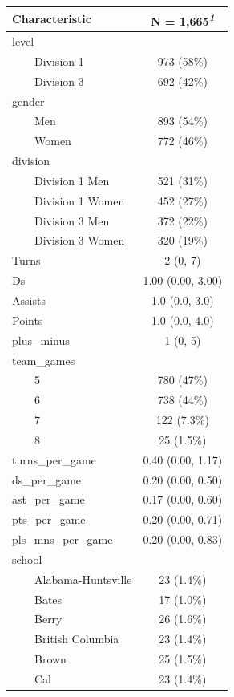 \documentclass[
  letterpaper,
  DIV=11,
  numbers=noendperiod]{scrartcl}
\begin{document}
\begin{table}
\fontsize{12.0pt}{14.4pt}\selectfont
\begin{tabular*}{\linewidth}{@{\extracolsep{\fill}}lc}
\toprule
\textbf{Characteristic} & \textbf{N = 1,665}\textsuperscript{\textit{1}} \\ 
\midrule\addlinespace[2.5pt]
level &  \\ 
    Division 1 & 973 (58\%) \\ 
    Division 3 & 692 (42\%) \\ 
gender &  \\ 
    Men & 893 (54\%) \\ 
    Women & 772 (46\%) \\ 
division &  \\ 
    Division 1 Men & 521 (31\%) \\ 
    Division 1 Women & 452 (27\%) \\ 
    Division 3 Men & 372 (22\%) \\ 
    Division 3 Women & 320 (19\%) \\ 
Turns & 2 (0, 7) \\ 
Ds & 1.00 (0.00, 3.00) \\ 
Assists & 1.0 (0.0, 3.0) \\ 
Points & 1.0 (0.0, 4.0) \\ 
plus\_minus & 1 (0, 5) \\ 
team\_games &  \\ 
    5 & 780 (47\%) \\ 
    6 & 738 (44\%) \\ 
    7 & 122 (7.3\%) \\ 
    8 & 25 (1.5\%) \\ 
turns\_per\_game & 0.40 (0.00, 1.17) \\ 
ds\_per\_game & 0.20 (0.00, 0.50) \\ 
ast\_per\_game & 0.17 (0.00, 0.60) \\ 
pts\_per\_game & 0.20 (0.00, 0.71) \\ 
pls\_mns\_per\_game & 0.20 (0.00, 0.83) \\ 
school &  \\ 
    Alabama-Huntsville & 23 (1.4\%) \\ 
    Bates & 17 (1.0\%) \\ 
    Berry & 26 (1.6\%) \\ 
    British Columbia & 23 (1.4\%) \\ 
    Brown & 25 (1.5\%) \\ 
    Cal & 23 (1.4\%) \\ 

\end{tabular*}
\end{table}
\end{document}
